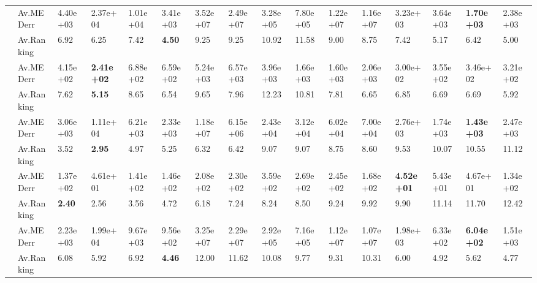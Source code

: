 \begin{ThreePartTable}
{\begin{longtable}{m{0.1cm} C{1.25cm} m{0.88cm} m{0.88cm} m{0.88cm} m{0.88cm} m{0.88cm} m{0.88cm} m{0.88cm} m{0.88cm} m{0.88cm} m{0.88cm} m{0.88cm} m{0.88cm} m{0.88cm} m{0.88cm}}
\midrule
 & Av.MEDerr  & 4.40e+03 & 2.37e+04 & 1.01e+04 & 3.41e+03 & 3.52e+07 & 2.49e+07 & 3.28e+05 & 7.80e+05 & 1.22e+07 & 1.16e+07 & 3.23e+03 & 3.64e+03 & \textbf{1.70e+03} & 2.38e+03 \\
& Av.Ranking  & 6.92 & 6.25 & 7.42 & \textbf{4.50} & 9.25 & 9.25 & 10.92 & 11.58 & 9.00 & 8.75 & 7.42 & 5.17 & 6.42 & 5.00 \\
\midrule
 & Av.MEDerr  & 4.15e+02 & \textbf{2.41e+02} & 6.88e+02 & 6.59e+02 & 5.24e+03 & 6.57e+03 & 3.96e+03 & 1.66e+03 & 1.60e+03 & 2.06e+03 & 3.00e+02 & 3.55e+02 & 3.46e+02 & 3.21e+02 \\
& Av.Ranking  & 7.62 & \textbf{5.15} & 8.65 & 6.54 & 9.65 & 7.96 & 12.23 & 10.81 & 7.81 & 6.65 & 6.85 & 6.69 & 6.69 & 5.92 \\
\midrule
 & Av.MEDerr  & 3.06e+03 & 1.11e+04 & 6.21e+03 & 2.33e+03 & 1.18e+07 & 6.15e+06 & 2.43e+04 & 3.12e+04 & 6.02e+04 & 7.00e+04 & 2.76e+03 & 1.74e+03 & \textbf{1.43e+03} & 2.47e+03 \\
& Av.Ranking  & 3.52 & \textbf{2.95} & 4.97 & 5.25 & 6.32 & 6.42 & 9.07 & 9.07 & 8.75 & 8.60 & 9.53 & 10.07 & 10.55 & 11.12 \\
\midrule
 & Av.MEDerr  & 1.37e+02 & 4.61e+01 & 1.41e+02 & 1.46e+02 & 2.08e+02 & 2.30e+02 & 3.59e+02 & 2.69e+02 & 2.45e+02 & 1.68e+02 & \textbf{4.52e+01} & 5.43e+01 & 4.67e+01 & 1.34e+02 \\
& Av.Ranking  & \textbf{2.40} & 2.56 & 3.56 & 4.72 & 6.18 & 7.24 & 8.24 & 8.50 & 9.24 & 9.92 & 9.90 & 11.14 & 11.70 & 12.42 \\\midrule
 & Av.MEDerr  & 2.23e+03 & 1.99e+04 & 9.67e+03 & 9.56e+02 & 3.25e+07 & 2.29e+07 & 2.92e+05 & 7.16e+05 & 1.12e+07 & 1.07e+07 & 1.98e+03 & 6.33e+02 & \textbf{6.04e+02} & 1.51e+03 \\
& Av.Ranking  & 6.08 & 5.92 & 6.92 & \textbf{4.46} & 12.00 & 11.62 & 10.08 & 9.77 & 9.31 & 10.31 & 6.00 & 4.92 & 5.62 & 4.77 \\
\midrule

\end{longtable}}
\end{ThreePartTable}
